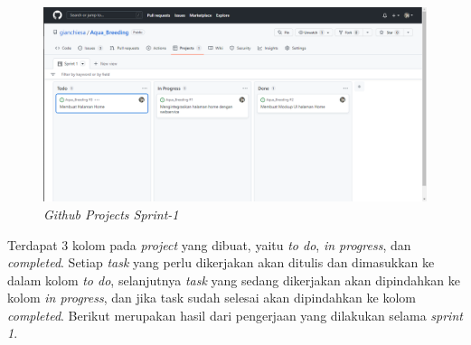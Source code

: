 \begin{figure}[H]
	\centering
	\includegraphics[keepaspectratio, width=14cm]{gambar/githubprojectgian}
	\caption{\textit{Github Projects Sprint-1}}
	\label{gambar:sprint1_projects}
\end{figure}
	
Terdapat 3 kolom pada \textit{project} yang dibuat, yaitu \textit{to do}, \textit{in progress}, dan \textit{completed}. Setiap \textit{task} yang perlu dikerjakan akan ditulis dan dimasukkan ke dalam kolom \textit{to do}, selanjutnya \textit{task} yang sedang dikerjakan akan dipindahkan ke kolom \textit{in progress}, dan jika task sudah selesai akan dipindahkan ke kolom \textit{completed}. Berikut merupakan hasil dari pengerjaan yang dilakukan selama \textit{sprint 1}.

